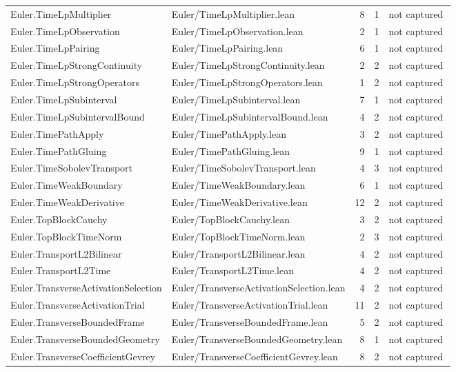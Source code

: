 \documentclass[10pt]{article}
\begin{document}
\begin{longtable}{p{0.28\linewidth}p{0.27\linewidth}r r p{0.20\linewidth}}
Euler.TimeLpMultiplier & Euler/TimeLpMultiplier.lean & 8 & 1 & not captured\\
Euler.TimeLpObservation & Euler/TimeLpObservation.lean & 2 & 1 & not captured\\
Euler.TimeLpPairing & Euler/TimeLpPairing.lean & 6 & 1 & not captured\\
Euler.TimeLpStrongContinuity & Euler/TimeLpStrongContinuity.lean & 2 & 2 & not captured\\
Euler.TimeLpStrongOperators & Euler/TimeLpStrongOperators.lean & 1 & 2 & not captured\\
Euler.TimeLpSubinterval & Euler/TimeLpSubinterval.lean & 7 & 1 & not captured\\
Euler.TimeLpSubintervalBound & Euler/TimeLpSubintervalBound.lean & 4 & 2 & not captured\\
Euler.TimePathApply & Euler/TimePathApply.lean & 3 & 2 & not captured\\
Euler.TimePathGluing & Euler/TimePathGluing.lean & 9 & 1 & not captured\\
Euler.TimeSobolevTransport & Euler/TimeSobolevTransport.lean & 4 & 3 & not captured\\
Euler.TimeWeakBoundary & Euler/TimeWeakBoundary.lean & 6 & 1 & not captured\\
Euler.TimeWeakDerivative & Euler/TimeWeakDerivative.lean & 12 & 2 & not captured\\
Euler.TopBlockCauchy & Euler/TopBlockCauchy.lean & 3 & 2 & not captured\\
Euler.TopBlockTimeNorm & Euler/TopBlockTimeNorm.lean & 2 & 3 & not captured\\
Euler.TransportL2Bilinear & Euler/TransportL2Bilinear.lean & 4 & 2 & not captured\\
Euler.TransportL2Time & Euler/TransportL2Time.lean & 4 & 2 & not captured\\
Euler.TransverseActivationSelection & Euler/TransverseActivationSelection.lean & 4 & 2 & not captured\\
Euler.TransverseActivationTrial & Euler/TransverseActivationTrial.lean & 11 & 2 & not captured\\
Euler.TransverseBoundedFrame & Euler/TransverseBoundedFrame.lean & 5 & 2 & not captured\\
Euler.TransverseBoundedGeometry & Euler/TransverseBoundedGeometry.lean & 8 & 1 & not captured\\
Euler.TransverseCoefficientGevrey & Euler/TransverseCoefficientGevrey.lean & 8 & 2 & not captured\\

\end{longtable}
\end{document}
